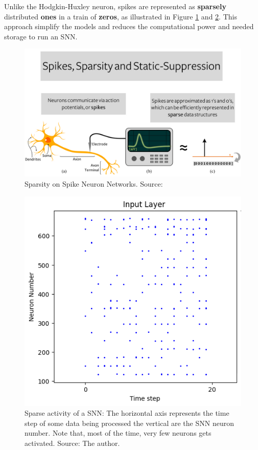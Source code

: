 			\par Unlike the Hodgkin-Huxley neuron, spikes are represented as \textbf{sparsely} distributed \textbf{ones} in a train of \textbf{zeros}, as illustrated in Figure \ref{fig:spikessparsitystaticsupress} and \ref{fig:sparsity}. This approach simplify the models and reduces the computational power and needed storage to run an SNN.\newline
			
			\begin{multicols}{2}
				\begin{figure}[H]
					\centering
					\includegraphics[width=\linewidth]{images/spikesSparsityStaticSupress}
					\caption{Sparsity on Spike Neuron Networks. Source: \cite{10242251}}
					\label{fig:spikessparsitystaticsupress}
				\end{figure}
			\columnbreak
				\begin{figure}[H]
					\centering
					\includegraphics[width=.5\linewidth]{images/sparsity}
					\caption[Sparse activity of a SNN]{Sparse activity of a SNN: The horizontal axis represents the time step of some data being processed the vertical are the SNN neuron number. Note that, most of the time, very few neurons gets activated. Source: The author.}
					\label{fig:sparsity}
				\end{figure}
			\end{multicols}
				
